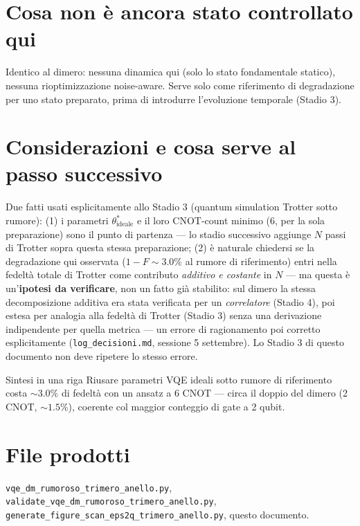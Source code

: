 \documentclass[11pt,a4paper]{article}
\begin{document}
\section{Cosa non è ancora stato controllato qui}

Identico al dimero: nessuna dinamica qui (solo lo stato fondamentale
statico), nessuna rioptimizzazione noise-aware. Serve solo come
riferimento di degradazione per uno stato preparato, prima di introdurre
l'evoluzione temporale (Stadio 3).

\section{Considerazioni e cosa serve al passo successivo}

Due fatti usati esplicitamente allo Stadio 3 (quantum simulation Trotter
sotto rumore): (1) i parametri $\theta^*_\text{ideale}$ e il loro
CNOT-count minimo (6, per la sola preparazione) sono il punto di partenza
--- lo stadio successivo aggiunge $N$ passi di Trotter sopra questa
stessa preparazione; (2) è naturale chiedersi se la degradazione qui
osservata ($1-F\sim3.0\%$ al rumore di riferimento) entri nella fedeltà
totale di Trotter come contributo \emph{additivo e costante} in $N$ ---
ma questa è un'\textbf{ipotesi da verificare}, non un fatto già stabilito:
sul dimero la stessa decomposizione additiva era stata verificata per un
\emph{correlatore} (Stadio 4), poi estesa per analogia alla fedeltà di
Trotter (Stadio 3) senza una derivazione indipendente per quella metrica
--- un errore di ragionamento poi corretto esplicitamente
(\texttt{log\_decisioni.md}, sessione 5 settembre). Lo Stadio 3 di questo
documento non deve ripetere lo stesso errore.

\begin{okbox}{Sintesi in una riga}
Riusare parametri VQE ideali sotto rumore di riferimento costa
$\sim3.0\%$ di fedeltà con un ansatz a 6 CNOT --- circa il doppio del
dimero (2 CNOT, $\sim1.5\%$), coerente col maggior conteggio di gate a 2
qubit.
\end{okbox}

\section*{File prodotti}

\texttt{vqe\_dm\_\allowbreak rumoroso\_trimero\_anello.py},
\texttt{validate\_vqe\_dm\_\allowbreak rumoroso\_trimero\_anello.py},
\texttt{generate\_figure\_\allowbreak scan\_eps2q\_trimero\_anello.py},
questo documento.
\end{document}
